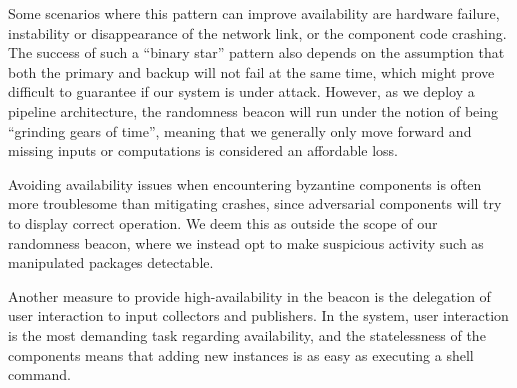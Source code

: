 Some scenarios where this pattern can improve availability are hardware failure, instability or disappearance of the network link, or the component code crashing.
The success of such a \enquote{binary star} pattern also depends on the assumption that both the primary and backup will not fail at the same time, which might prove difficult to guarantee if our system is under attack.
However, as we deploy a pipeline architecture, the randomness beacon will run under the notion of being \enquote{grinding gears of time}, meaning that we generally only move forward and missing inputs or computations is considered an affordable loss.

Avoiding availability issues when encountering byzantine components is often more troublesome than mitigating crashes, since adversarial components will try to display correct operation.
We deem this as outside the scope of our randomness beacon, where we instead opt to make suspicious activity such as manipulated packages detectable.

Another measure to provide high-availability in the beacon is the delegation of user interaction to input collectors and publishers.
In the system, user interaction is the most demanding task regarding availability, and the statelessness of the components means that adding new instances is as easy as executing a shell command.
